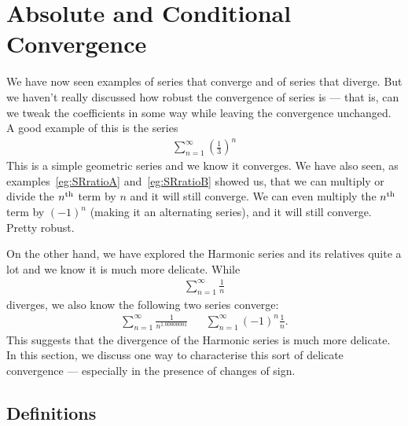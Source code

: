 \section{Absolute and Conditional Convergence}

We have now seen examples of series that converge and of series that diverge.
But we haven't really discussed how robust the convergence of series
is --- that is, can we tweak the coefficients in some way while
leaving the convergence unchanged. A good example of this is the
series
\begin{align*}
  \sum_{n=1}^\infty \left(\frac{1}{3} \right)^n
\end{align*}
This is a simple geometric series and we know it converges.
We have also seen, as examples~\ref{eg:SRratioA} and~\ref{eg:SRratioB}
showed us, that we can multiply or divide the $n^{\rm th}$ term by $n$ and it
will still converge. We can even multiply the $n^{\rm th}$ term
by $(-1)^n$ (making it an alternating series), and it will still converge. Pretty robust.

On the other hand, we have explored the Harmonic series and its
relatives quite a lot and we know it is much more delicate. While
\begin{align*}
  \sum_{n=1}^\infty \frac{1}{n}
\end{align*}
diverges, we also know the following two series converge:
\begin{align*}
  \sum_{n=1}^\infty \frac{1}{n^{1.00000001}} &&  \sum_{n=1}^\infty (-1)^n \frac{1}{n}.
\end{align*}
This suggests that the divergence of the Harmonic series is much more
delicate. In this section, we discuss one way to characterise this
sort of delicate convergence --- especially in the presence of changes
of sign.


\subsection{Definitions}\label{sec:abs conv}

